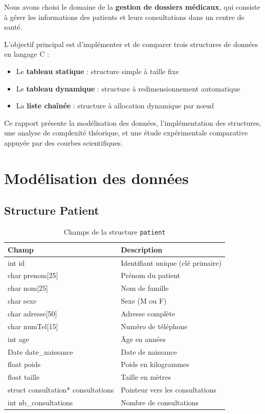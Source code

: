 \documentclass[12pt, a4paper]{article}
\begin{document}
Nous avons choisi le domaine de la \textbf{gestion de dossiers médicaux}, 
qui consiste à gérer les informations des patients et leurs consultations 
dans un centre de santé.

L'objectif principal est d'implémenter et de comparer trois structures 
de données en langage C :
\begin{itemize}[leftmargin=2em, itemsep=3pt]
    \item Le \textbf{tableau statique} : structure simple à taille fixe
    \item Le \textbf{tableau dynamique} : structure à redimensionnement automatique
    \item La \textbf{liste chaînée} : structure à allocation dynamique par nœud
\end{itemize}

Ce rapport présente la modélisation des données, l'implémentation 
des structures, une analyse de complexité théorique, et une étude 
expérimentale comparative appuyée par des courbes scientifiques.

\section{Modélisation des données}

\subsection{Structure Patient}

\begin{table}[h]
\centering
{}
\begin{tabular}{>{\ttfamily}l l}
\toprule
\textbf{Champ} & \textbf{Description} \\
\midrule
int id & Identifiant unique (clé primaire) \\
char prenom[25] & Prénom du patient \\
char nom[25] & Nom de famille \\
char sexe & Sexe (M ou F) \\
char adresse[50] & Adresse complète \\
char numTel[15] & Numéro de téléphone \\
int age & Âge en années \\
Date date\_naissance & Date de naissance \\
float poids & Poids en kilogrammes \\
float taille & Taille en mètres \\
struct consultation* consultations & Pointeur vers les consultations \\
int nb\_consultations & Nombre de consultations \\
\bottomrule
\end{tabular}
\caption{Champs de la structure \texttt{patient}}
\end{table}
\end{document}
